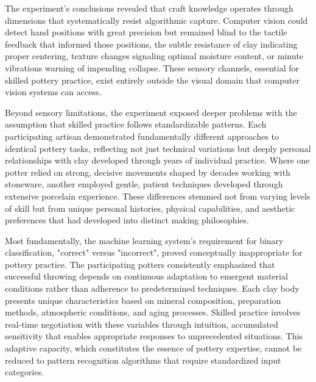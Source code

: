 The experiment's conclusions revealed that craft knowledge operates through dimensions that systematically resist algorithmic capture. Computer vision could detect hand positions with great precision but remained blind to the tactile feedback that informed those positions, the subtle resistance of clay indicating proper centering, texture changes signaling optimal moisture content, or minute vibrations warning of impending collapse. These sensory channels, essential for skilled pottery practice, exist entirely outside the visual domain that computer vision systems can access.

\vspace{0.5cm}

Beyond sensory limitations, the experiment exposed deeper problems with the assumption that skilled practice follows standardizable patterns. Each participating artisan demonstrated fundamentally different approaches to identical pottery tasks, reflecting not just technical variations but deeply personal relationships with clay developed through years of individual practice. Where one potter relied on strong, decisive movements shaped by decades working with stoneware, another employed gentle, patient techniques developed through extensive porcelain experience. These differences stemmed not from varying levels of skill but from unique personal histories, physical capabilities, and aesthetic preferences that had developed into distinct making philosophies.

\vspace{0.5cm}

Most fundamentally, the machine learning system's requirement for binary classification, "correct" versus "incorrect", proved conceptually inappropriate for pottery practice. The participating potters consistently emphasized that successful throwing depends on continuous adaptation to emergent material conditions rather than adherence to predetermined techniques. Each clay body presents unique characteristics based on mineral composition, preparation methods, atmospheric conditions, and aging processes. Skilled practice involves real-time negotiation with these variables through intuition, accumulated sensitivity that enables appropriate responses to unprecedented situations. This adaptive capacity, which constitutes the essence of pottery expertise, cannot be reduced to pattern recognition algorithms that require standardized input categories.







